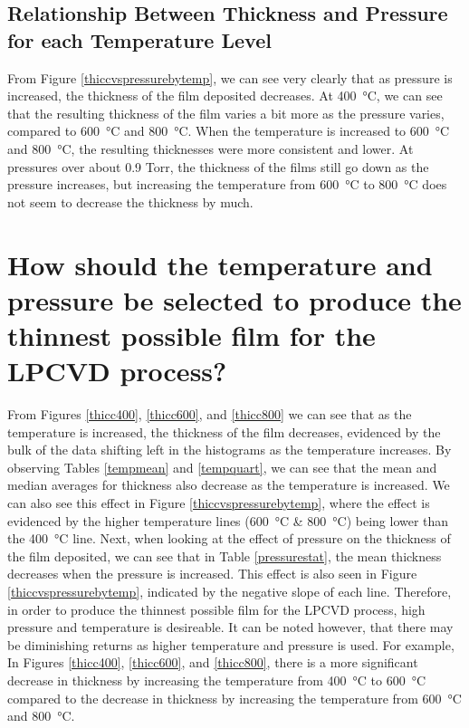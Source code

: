 \documentclass[letterpaper]{article}
\begin{document}
\subsection{Relationship Between Thickness and Pressure for each Temperature Level}

From Figure \ref{thiccvspressurebytemp}, we can see very clearly that as pressure
is increased, the thickness of the film deposited decreases. At \SI{400}{\celsius},
we can see that the resulting thickness of the film varies a bit more as the pressure
varies, compared to \SI{600}{\celsius} and \SI{800}{\celsius}. When the temperature is
increased to \SI{600}{\celsius} and \SI{800}{\celsius}, the resulting thicknesses were
more consistent and lower. At pressures over about 0.9 Torr, the thickness
of the films still go down as the pressure increases, but increasing the temperature from
\SI{600}{\celsius} to \SI{800}{\celsius} does not seem to decrease the thickness by much.

\section{How should the temperature and pressure be selected to produce the thinnest possible film for the LPCVD process?}

From Figures \ref{thicc400}, \ref{thicc600}, and \ref{thicc800} we can see that
as the temperature is increased, the thickness of the film decreases, evidenced
by the bulk of the data shifting left in the histograms as the temperature
increases. By observing Tables \ref{tempmean} and \ref{tempquart}, we can see
that the mean and median averages for thickness also decrease as the temperature
is increased. We can also see this effect in Figure \ref{thiccvspressurebytemp},
where the effect is evidenced by the higher temperature lines
(\SI{600}{\celsius} \& \SI{800}{\celsius}) being lower than the
\SI{400}{\celsius} line. Next, when looking at the effect of pressure on the
thickness of the film deposited, we can see that in Table \ref{pressurestat},
the mean thickness decreases when the pressure is increased. This effect is also
seen in Figure \ref{thiccvspressurebytemp}, indicated by the negative slope of
each line. Therefore, in order to produce the thinnest possible film for the
LPCVD process, high pressure and temperature is desireable. It can be noted
however, that there may be diminishing returns as higher temperature and
pressure is used. For example, In Figures \ref{thicc400}, \ref{thicc600}, and
\ref{thicc800}, there is a more significant decrease in thickness by increasing
the temperature from \SI{400}{\celsius} to \SI{600}{\celsius} compared to the
decrease in thickness by increasing the temperature from \SI{600}{\celsius}
and \SI{800}{\celsius}.
\end{document}
